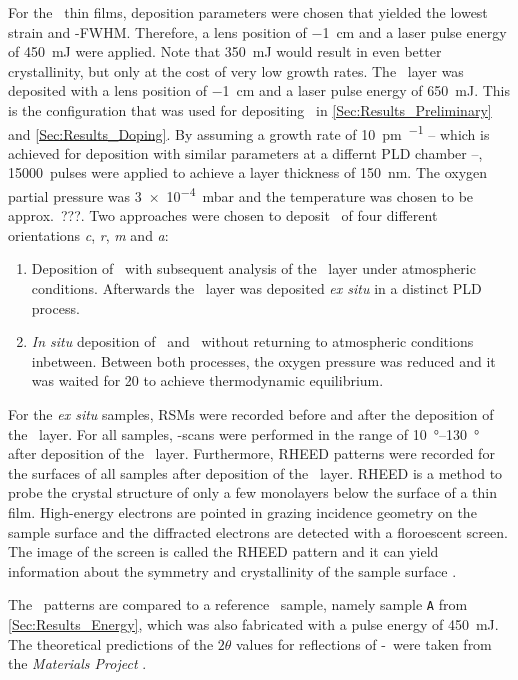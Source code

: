 For the \cro\ thin films, deposition parameters were chosen that yielded the lowest strain and \textomega-FWHM.
Therefore, a lens position of \qty{-1}{\cm} and a laser pulse energy of \qty{450}{\milli\joule} were applied.
Note that \qty{350}{\milli\joule} would result in even better crystallinity, but only at the cost of very low growth rates.
The \gao\ layer was deposited with a lens position of \qty{-1}{\cm} and a laser pulse energy of \qty{650}{\milli\joule}.
This is the configuration that was used for depositing \cro\ in \ref{Sec:Results_Preliminary} and \ref{Sec:Results_Doping}.
By assuming a growth rate of \qty{10}{\pm\per\pulse} -- which is achieved for deposition with similar parameters at a differnt PLD chamber --, \qty{15000}{pulses} were applied to achieve a layer thickness of \qty{150}{\nm}.
The oxygen partial pressure was \qty{3e-4}{\milli\bar} and the temperature was chosen to be approx.\ ???.
Two approaches were chosen to deposit \agao\ of four different orientations \textit{c}, \textit{r}, \textit{m} and \textit{a}:
\begin{enumerate}
    \item Deposition of \cro\ with subsequent analysis of the \cro\ layer under atmospheric conditions.
    Afterwards the \gao\ layer was deposited \textit{ex situ} in a distinct PLD process.
    \item \textit{In situ} deposition of \cro\ and \gao\ without returning to atmospheric conditions inbetween.
    Between both processes, the oxygen pressure was reduced and it was waited for \qty{20}{\min} to achieve thermodynamic equilibrium.
\end{enumerate}

For the \textit{ex situ} samples, \glspl{RSM} were recorded before and after the deposition of the \gao\ layer.
For all samples, \thetaomega-scans were performed in the range of \qtyrange{10}{130}{\degree} after deposition of the \gao\ layer.
Furthermore, \gls{RHEED} patterns were recorded for the surfaces of all samples after deposition of the \gao\ layer.
    \gls{RHEED} is a method to probe the crystal structure of only a few monolayers below the surface of a thin film.
    High-energy electrons are pointed in grazing incidence geometry on the sample surface and the diffracted electrons are detected with a floroescent screen.
    The image of the screen is called the RHEED pattern and it can yield information about the symmetry and crystallinity of the sample surface
        \cite{hafez2022}.

The \thetaomega\ patterns are compared to a reference \cro\ sample, namely sample \texttt{A} from \ref{Sec:Results_Energy}, which was also fabricated with a pulse energy of \qty{450}{\milli\joule}.
The theoretical predictions of the $2\theta$ values for reflections of \textbeta-\gao\ were taken from the \textit{Materials Project}
    \cite[mp-886]{MaterialsProject}.

